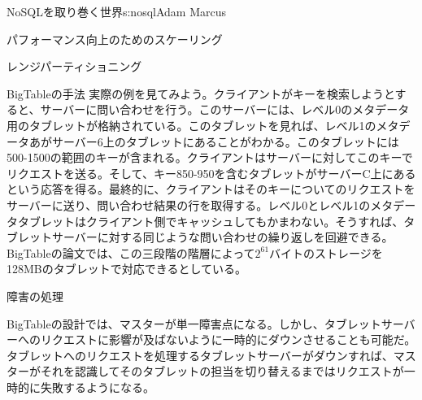 \begin{aosachapter}{NoSQLを取り巻く世界}{s:nosql}{Adam Marcus}
\begin{aosasect1}{パフォーマンス向上のためのスケーリング}
\begin{aosasect2}{レンジパーティショニング}
\begin{aosasect3}{BigTableの手法}
実際の例を見てみよう。クライアントがキーを検索しようとすると、サーバーに問い合わせを行う。このサーバーには、レベル0のメタデータ用のタブレットが格納されている。このタブレットを見れば、レベル1のメタデータあがサーバー6上のタブレットにあることがわかる。このタブレットには500-1500の範囲のキーが含まれる。クライアントはサーバーに対してこのキーでリクエストを送る。そして、キー850-950を含むタブレットがサーバーC上にあるという応答を得る。最終的に、クライアントはそのキーについてのリクエストをサーバーに送り、問い合わせ結果の行を取得する。レベル0とレベル1のメタデータタブレットはクライアント側でキャッシュしてもかまわない。そうすれば、タブレットサーバーに対する同じような問い合わせの繰り返しを回避できる。BigTableの論文では、この三段階の階層によって$2^{61}$バイトのストレージを128MBのタブレットで対応できるとしている。

\end{aosasect3}

\vspace{-0.1cm} %
\begin{aosasect3}{障害の処理}

BigTableの設計では、マスターが単一障害点になる。しかし、タブレットサーバーへのリクエストに影響が及ばないように一時的にダウンさせることも可能だ。タブレットへのリクエストを処理するタブレットサーバーがダウンすれば、マスターがそれを認識してそのタブレットの担当を切り替えるまではリクエストが一時的に失敗するようになる。


\end{aosasect3}
\end{aosasect2}
\end{aosasect1}
\end{aosachapter}
